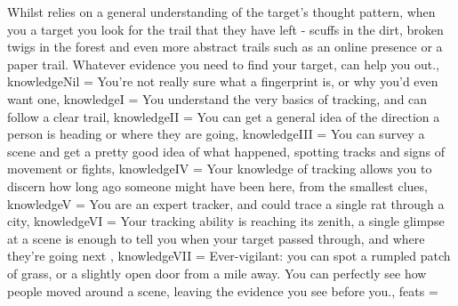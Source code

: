 {{Whilst  relies on a general understanding of the target's thought pattern, when you  a target you look for the trail that they have left - scuffs in the dirt, broken twigs in the forest and even more abstract trails such as an online presence or a paper trail. Whatever evidence you need to find your target,  can help you out.},
knowledgeNil = {You're not really sure what a fingerprint is, or why you'd even want one},
knowledgeI = {You understand the very basics of tracking, and can follow a clear trail},
knowledgeII = {You can get a general idea of the direction a person is heading or where they are going},
knowledgeIII = {You can survey a scene and get a pretty good idea of what happened, spotting tracks and signs of movement or fights},
knowledgeIV = {Your knowledge of tracking allows you to discern how long ago someone might have been here, from the smallest clues},
knowledgeV =  {You are an expert tracker, and could trace a single rat through a city},
knowledgeVI = {Your tracking ability is reaching its zenith, a single glimpse at a scene is enough to tell you when your target passed through, and where they're going next} ,
knowledgeVII = {Ever-vigilant: you can spot a rumpled patch of grass, or a slightly open door from a mile away. You can perfectly see how people moved around a scene, leaving the evidence you see before you.},
feats = 
}
